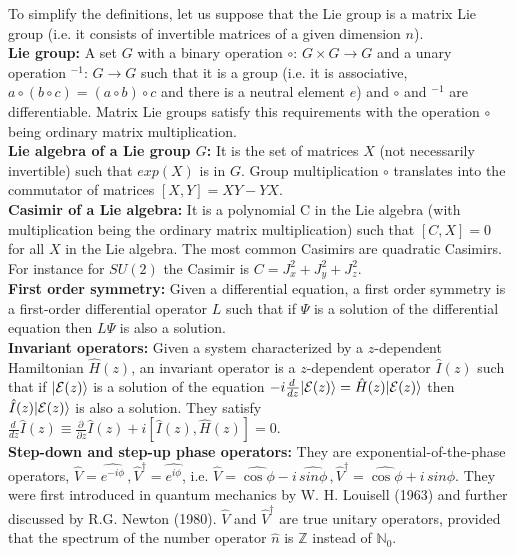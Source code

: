 \documentclass[12pt]{iopart}
\begin{document}
To simplify the definitions, let us suppose that the Lie group is a matrix Lie group (i.e. it consists of
invertible matrices of a given dimension $n$).
\\
\textbf{Lie group:} A set $G$ with a binary operation $\circ:\,G\times G\rightarrow G$ and a unary operation ${}^{-1}:\,G\rightarrow G$
such that it is a group (i.e. it is associative, $a\circ (b\circ c)=(a\circ b)\circ c$ 
and there is a neutral element $e$) and $\circ$ and ${}^{-1}$ are differentiable. Matrix Lie groups satisfy
this requirements with the operation $\circ$ being ordinary matrix multiplication.
\\
\textbf{Lie algebra of a Lie group $G$:} It is the set of matrices $X$ (not necessarily invertible) such that $exp(X)$ 
is in $G$. Group multiplication $\circ$ translates into the commutator of matrices $[X,Y]=XY-YX$.
\\
\textbf{Casimir of a Lie algebra:} It is a polynomial C in the Lie algebra (with multiplication being the ordinary matrix
multiplication) such that $[C,X]=0$ for all $X$ in the Lie algebra. The most common Casimirs are quadratic 
Casimirs. For instance for $SU(2)$ the Casimir is $C=J_x^2 + J_y^2+J_z^2$.
\\
\textbf{First order symmetry: } Given a differential equation, a first order symmetry is a first-order
differential operator $L$ such that if $\Psi$ is a solution of the differential equation then $L\Psi$ is also
a solution.
\\
\textbf{Invariant operators: } Given a system characterized by a $z$-dependent Hamiltonian $\hat{H}(z)$,
an invariant operator is a $z$-dependent operator $\hat{I}(z)$ such that if $|{\cal E}(z)\rangle$ is a solution
of the equation $-i\frac{d\, }{dz}|{\cal E}(z)\rangle=\hat{H}(z)|{\cal E}(z)\rangle $ then $\hat{I}(z)|{\cal E}(z)\rangle$  is also a solution. They satisfy 
$\frac{d\, }{dz}\hat{I}(z)\equiv \frac{\partial\,}{\partial z}\hat{I}(z)+i[\hat{I}(z),\hat{H}(z)]=0$.
\\
\textbf{Step-down and step-up phase operators:}  They are exponential-of-the-phase operators, $\hat{V} = \widehat{e^{-i \phi}}\,, \hat{V}^\dag = \widehat{e^{i \phi}}$, i.e. $\hat{V} = \widehat{\cos\phi}-i\,\widehat{sin\phi}\,,\hat{V}^\dag = \widehat{\cos\phi}+i\,\widehat{sin\phi}$.
They were first introduced in quantum mechanics by W. H. Louisell (1963)  and further discussed by R.G. Newton (1980). $\hat{V}$ and $\hat{V}^\dag$ are true unitary operators, provided that the spectrum of the number operator $\hat{n}$ is $\mathbb{Z}$ instead of $\mathbb{N}_0$.
\end{document}
